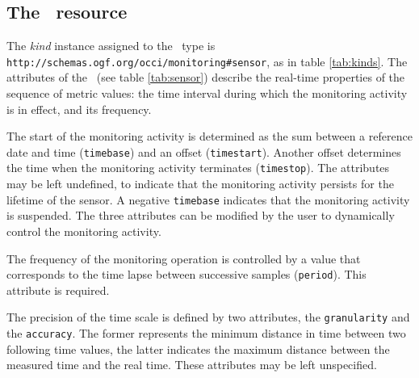 \documentclass[10pt,a4paper]{article}
\begin{document}
\subsection{The \sens\ resource \label{sec:sensor}}


The {\em kind} instance assigned to the \sens\ type is {\tt http://schemas.ogf.org/occi/monitoring\#sensor}, as in table \ref{tab:kinds}. The attributes of the \sens\ (see table \ref{tab:sensor}) describe the real-time properties of the sequence of metric values: the time interval during which the monitoring activity is in effect, and its frequency.

The start of the monitoring activity is determined as the sum between a reference date and time ({\tt timebase}) and an offset ({\tt timestart}). Another offset determines the time when the monitoring activity terminates ({\tt timestop}). The attributes may be left undefined, to indicate that the monitoring activity persists for the lifetime of the sensor. A negative {\tt timebase} indicates that the monitoring activity is suspended. The three attributes can be modified by the user to dynamically control the monitoring activity.

The frequency of the monitoring operation is controlled by a value that corresponds to the time lapse between successive samples ({\tt period}). This attribute is required.

The precision of the time scale is defined by two attributes, the {\tt granularity} and the {\tt accuracy}. The former represents the minimum distance in time between two following time values, the latter indicates the maximum distance between the measured time and the real time. These attributes may be left unspecified.
\end{document}

